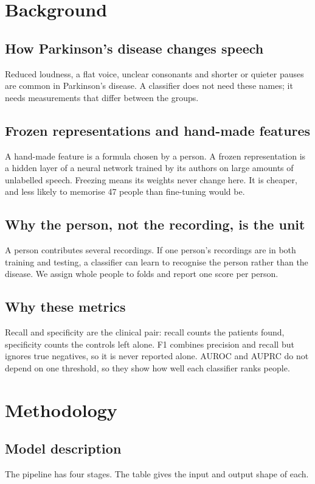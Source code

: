 \documentclass[11pt,a4paper]{article}
\begin{document}
\section{Background}\label{sec:background}
\subsection{How Parkinson's disease changes speech}
Reduced loudness, a flat voice, unclear consonants and shorter or quieter pauses are common in Parkinson's disease. A classifier does not need these names; it needs measurements that differ between the groups.

\subsection{Frozen representations and hand-made features}
A hand-made feature is a formula chosen by a person. A frozen representation is a hidden layer of a neural network trained by its authors on large amounts of unlabelled speech. Freezing means its weights never change here. It is cheaper, and less likely to memorise 47 people than fine-tuning would be.

\subsection{Why the person, not the recording, is the unit}
A person contributes several recordings. If one person's recordings are in both training and testing, a classifier can learn to recognise the person rather than the disease. We assign whole people to folds and report one score per person.

\subsection{Why these metrics}
Recall and specificity are the clinical pair: recall counts the patients found, specificity counts the controls left alone. F1 combines precision and recall but ignores true negatives, so it is never reported alone. AUROC and AUPRC do not depend on one threshold, so they show how well each classifier ranks people.

\section{Methodology}\label{sec:method}
\subsection{Model description}\label{sec:model}
The pipeline has four stages. The table gives the input and output shape of each.
\end{document}

